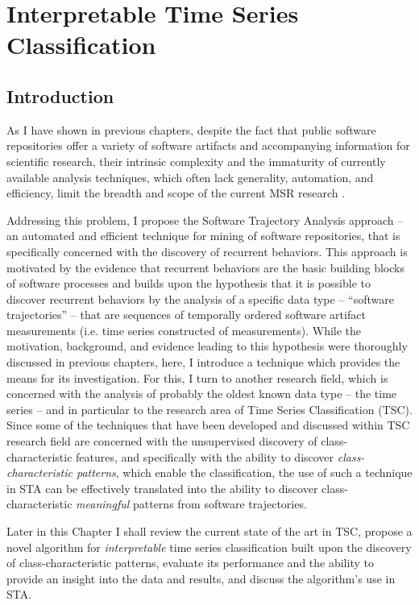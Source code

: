 \chapter{Interpretable Time Series Classification}\label{chapter_sax_vsm}

\section{Introduction}
As I have shown in previous chapters, despite the fact that public software repositories offer a variety of software 
artifacts and accompanying information for scientific research, their intrinsic complexity and the immaturity of 
currently available analysis techniques, which often lack generality, automation, and efficiency, limit the breadth 
and scope of the current MSR research \cite{citeulike:7853299} \cite{citeulike:12550438}.

Addressing this problem, I propose the Software Trajectory Analysis approach -- an automated and efficient technique
for mining of software repositories, that is specifically concerned with the discovery of recurrent behaviors.
This approach is motivated by the evidence that recurrent behaviors are the basic building blocks of software 
processes \cite{neal2012habits} \cite{1903} \cite{citeulike:13208461} and builds upon the hypothesis that it is 
possible to discover recurrent behaviors by the analysis of a specific data type -- ``software trajectories'' -- 
that are sequences of temporally ordered software artifact measurements (i.e. time series constructed of measurements).
While the motivation, background, and evidence leading to this hypothesis were thoroughly discussed in 
previous chapters, here, I introduce a technique which provides the means for its investigation. 
For this, I turn to another research field, which is concerned with the analysis of probably the oldest known 
data type -- the time series \cite{citeulike:1454223} -- and in particular to the research area of 
Time Series Classification (TSC). Since some of the techniques that have been developed and discussed 
within TSC research field are concerned with the unsupervised discovery of class-characteristic features, 
and specifically with the ability to discover \textit{class-characteristic patterns}, which enable the classification, 
the use of such a technique in STA can be effectively translated into the ability to discover class-characteristic 
\textit{meaningful} patterns from software trajectories. 

Later in this Chapter I shall review the current state of the art in TSC, 
propose a novel algorithm for \textit{interpretable} time series classification built upon the discovery of 
class-characteristic patterns, evaluate its performance and the ability to provide an insight into the data and results, 
and discuss the algorithm's use in STA.

